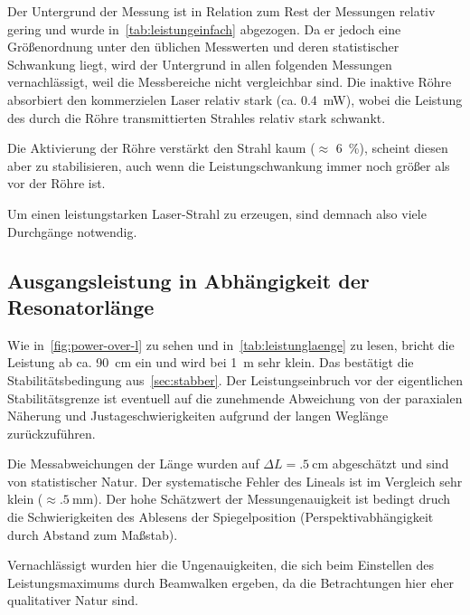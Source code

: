 \documentclass[slug=GL, room=HZDR\ Dresden/Rossendorf\,\ Geb.\ 620/123, supervisor=Tim\ Ziegler]{../../Lab_Report_LaTeX/lab_report}
\begin{document}
Der Untergrund der Messung ist in Relation zum Rest der Messungen
relativ gering und wurde in~\ref{tab:leistungeinfach} abgezogen. Da
er jedoch eine Gr\"o\ss{}enordnung unter den \"ublichen Messwerten und
deren statistischer Schwankung liegt, wird der Untergrund in allen
folgenden Messungen vernachl\"assigt, weil die Messbereiche nicht
vergleichbar sind.
Die inaktive R\"ohre absorbiert den kommerzielen Laser relativ stark
(ca. \SI{0.4}{\milli\watt}), wobei die Leistung des durch die R\"ohre
transmittierten Strahles relativ stark schwankt.

Die Aktivierung der R\"ohre verst\"arkt den Strahl kaum (\(\approx\)
\SI{6}{\percent}), scheint diesen aber zu stabilisieren, auch wenn die
Leistungschwankung immer noch gr\"o\ss{}er als vor der R\"ohre ist.

Um einen leistungstarken Laser-Strahl zu erzeugen, sind demnach also
viele Durchg\"ange notwendig.

\subsection{Ausgangsleistung in Abh\"angigkeit der Resonatorl\"ange}

Wie in~\ref{fig:power-over-l} zu sehen und in~\ref{tab:leistunglaenge}
zu lesen, bricht die Leistung ab
ca. \SI{90}{\centi\meter} ein und wird bei \SI{1}{\meter} sehr klein.
Das best\"atigt die Stabilit\"atsbedingung aus~\ref{sec:stabber}. Der
Leistungseinbruch vor der eigentlichen Stabilit\"atsgrenze ist
eventuell auf die zunehmende Abweichung von der paraxialen N\"aherung
und Justageschwierigkeiten aufgrund der langen Wegl\"ange
zur\"uckzuf\"uhren.

Die Messabweichungen der L\"ange wurden auf \(\Delta L = \SI{.5}{\centi\meter}\)
abgesch\"atzt und sind von statistischer Natur. Der systematische
Fehler des Lineals ist im Vergleich sehr klein (\(\approx
\SI{.5}{\milli\meter}\)). Der hohe Sch\"atzwert der Messungenauigkeit ist
bedingt druch die Schwierigkeiten des Ablesens der Spiegelposition
(Perspektivabh\"angigkeit durch Abstand zum Ma\ss{}stab).


Vernachl\"assigt wurden hier die Ungenauigkeiten, die sich beim
Einstellen des Leistungsmaximums durch Beamwalken ergeben, da die
Betrachtungen hier eher qualitativer Natur sind.
\end{document}
